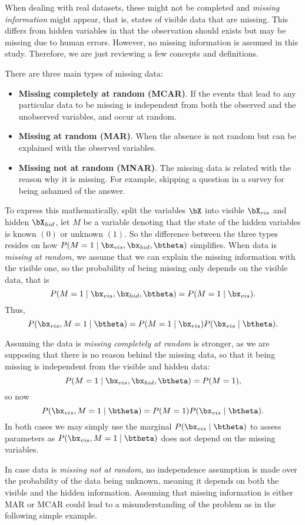 
When dealing with real datasets, these might not be completed and \emph{missing information} might appear, that is, states of visible data that are missing. This differs from hidden variables in that the observation should exists but may be missing due to human errors. However, no missing information is assumed in this study. Therefore, we are just reviewing a few concepts and definitions.

There are three main types of missing data:
\begin{itemize}
  \item \textbf{Missing completely at random (MCAR)}. If the events that lead to any particular data to be missing is independent from both the observed and the unobserved variables, and occur at random.
  \item \textbf{Missing at random (MAR)}. When the absence is not random but can be explained with the observed variables.
  \item \textbf{Missing not at random (MNAR)}. The missing data is related with the reason why it is missing. For example, skipping a question in a survey for being ashamed of the answer.
\end{itemize}

To express this mathematically, split the variables \(\bX\) into visible \(\bX_{vis}\) and hidden \(\bX_{hid}\), let \(M\) be a variable denoting that the state of the hidden variables is known \((0)\) or unknown \((1)\).
So the difference between the three types resides on how \(P(M = 1 \mid \bx_{vis}, \bx_{hid}, \btheta)\) simplifies. When data is \emph{missing at random}, we assume that we can explain the missing information with the visible one, so the probability of being missing only depends on the visible data, that is
\[
  P(M = 1 \mid \bx_{vis}, \bx_{hid}, \btheta) = P(M = 1 \mid \bx_{vis}).
\]
Thus,
\[
  P(\bx_{vis}, M = 1 \mid \btheta) = P(M = 1 \mid \bx_{vis})P(\bx_{vis} \mid \btheta).
\]

Assuming the data is \emph{missing completely at random} is stronger, as we are supposing that there is no reason behind the missing data, so that it being missing is independent from the visible and hidden data:
\[
  P(M = 1 \mid \bx_{vis}, \bx_{hid}, \btheta) = P(M = 1),
\]
so now
\[
    P(\bx_{vis}, M = 1 \mid \btheta) = P(M = 1)P(\bx_{vis} \mid \btheta).
\]
In both cases we may simply use the marginal \(P(\bx_{vis} \mid \btheta)\) to assess parameters as \(P(\bx_{vis}, M = 1 \mid \btheta)\) does not depend on the missing variables.

In case data is \emph{missing not at random}, no independence assumption is made over the probability of the data being unknown, meaning it depends on both the visible and the hidden information. Assuming that missing information is either MAR or MCAR could lead to a misunderstanding of the problem as in the following simple example.

